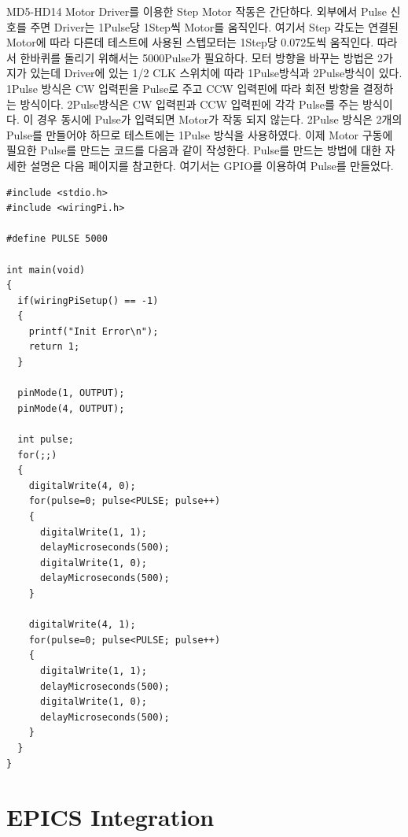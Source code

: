 \documentclass[11pt
  , a4paper
  , article
  , oneside
]{memoir}
\begin{document}
MD5-HD14 Motor Driver를 이용한 Step Motor 작동은 간단하다. 외부에서 Pulse 신호를 주면 Driver는 1Pulse당
1Step씩 Motor를 움직인다. 여기서 Step 각도는 연결된 Motor에 따라 다른데 테스트에 사용된 스텝모터는 
1Step당 0.072도씩 움직인다. 따라서 한바퀴를 돌리기 위해서는 5000Pulse가 필요하다. 
모터 방향을 바꾸는 방법은 2가지가 있는데 Driver에 있는 1/2 CLK 스위치에 따라 1Pulse방식과 2Pulse방식이 
있다. 1Pulse 방식은 CW 입력핀을 Pulse로 주고 CCW 입력핀에 따라 회전 방향을 결정하는 방식이다. 
2Pulse방식은 CW 입력핀과 CCW 입력핀에 각각 Pulse를 주는 방식이다. 이 경우 동시에 Pulse가 입력되면 
Motor가 작동 되지 않는다. 2Pulse 방식은 2개의 Pulse를 만들어야 하므로 테스트에는 1Pulse 방식을 
사용하였다. 이제 Motor 구동에 필요한 Pulse를 만드는 코드를 다음과 같이 작성한다. Pulse를 만드는 방법에 
대한 자세한 설명은 다음 페이지를 참고한다. 여기서는 GPIO를 이용하여 Pulse를 만들었다.
\begin{lstlisting}[style=termstylenumber, caption={Editing \texttt{/etc/fai/NFSROOT}}, label={list:nfsroot-file}]
#include <stdio.h>
#include <wiringPi.h>

#define PULSE 5000

int main(void)
{
  if(wiringPiSetup() == -1)
  {
    printf("Init Error\n");
    return 1;
  }

  pinMode(1, OUTPUT);
  pinMode(4, OUTPUT);

  int pulse;
  for(;;)
  {
    digitalWrite(4, 0);
    for(pulse=0; pulse<PULSE; pulse++)
    {
      digitalWrite(1, 1);
      delayMicroseconds(500);
      digitalWrite(1, 0);
      delayMicroseconds(500);
    }

    digitalWrite(4, 1);
    for(pulse=0; pulse<PULSE; pulse++)
    {
      digitalWrite(1, 1);
      delayMicroseconds(500);
      digitalWrite(1, 0);
      delayMicroseconds(500);
    }
  }
}

\end{lstlisting}
\chapter{EPICS Integration}
\end{document}
